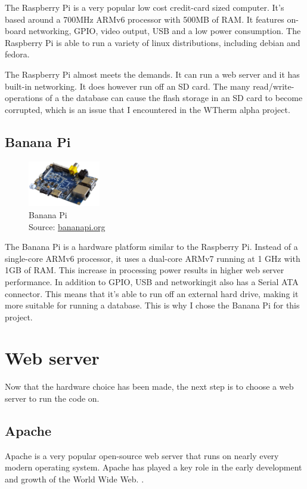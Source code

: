 \documentclass[12pt,a4paper,final]{report}
\newcommand*{\captionsource}[2]{%
  \caption[{#1}]{%
    #1%
    \\\hspace{\linewidth}%
    Source: #2%
  }%
}
\begin{document}
The Raspberry Pi is a very popular low cost credit-card sized computer. It's based around a 700MHz ARMv6 processor with 500MB of RAM. It features on-board networking, GPIO, video output, USB and a low power consumption. The Raspberry Pi is able to run a variety of linux distributions, including debian and fedora\cite{RasPiDoc}.

The Raspberry Pi almost meets the demands. It can run a web server and it has built-in networking. It does however run off an SD card. The many read/write-operations of a the database can cause the flash storage in an SD card to become corrupted, which is an issue that I encountered in the WTherm alpha project.

\section*{Banana Pi}
\begin{figure}
  \vspace{-33pt}
  \begin{center}
      \includegraphics[width=0.28\textwidth]{BananaPi}
  \end{center}
  \vspace{-20pt}
  \captionsource{Banana Pi}{\url{bananapi.org}}
\end{figure}
The Banana Pi is a hardware platform similar to the Raspberry Pi. Instead of a single-core ARMv6 processor, it uses a dual-core ARMv7 running at 1 GHz with 1GB of RAM. This increase in processing power results in higher web server performance. In addition to GPIO, USB and networkingit also has a Serial ATA connector. This means that it's able to run off an external hard drive, making it more suitable for running a database\cite{BananaPiDoc}. This is why I chose the Banana Pi for this project.

\chapter{Web server}
Now that the hardware choice has been made, the next step is to choose a web server to run the code on.
\section*{Apache}
Apache is a very popular open-source web server that runs on nearly every modern operating system. Apache has played a key role in the early development and growth of the World Wide Web. \cite{ApacheServer}.
\end{document}
